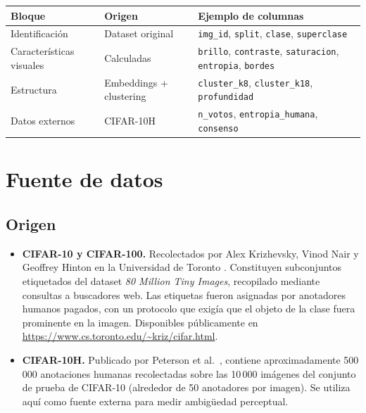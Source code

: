 \documentclass[11pt,a4paper]{article}
\begin{document}
\begin{center}
\small
\begin{tabular}{@{}lll@{}}
\toprule
\textbf{Bloque} & \textbf{Origen} & \textbf{Ejemplo de columnas} \\
\midrule
Identificación & Dataset original & \texttt{img\_id}, \texttt{split}, \texttt{clase}, \texttt{superclase} \\
Características visuales & Calculadas & \texttt{brillo}, \texttt{contraste}, \texttt{saturacion}, \texttt{entropia}, \texttt{bordes} \\
Estructura & Embeddings + clustering & \texttt{cluster\_k8}, \texttt{cluster\_k18}, \texttt{profundidad} \\
Datos externos & CIFAR-10H & \texttt{n\_votos}, \texttt{entropia\_humana}, \texttt{consenso} \\
\bottomrule
\end{tabular}
\end{center}

\section{Fuente de datos}

\subsection{Origen}

\begin{itemize}[leftmargin=*]
  \item \textbf{CIFAR-10 y CIFAR-100.} Recolectados por Alex Krizhevsky, Vinod
  Nair y Geoffrey Hinton en la Universidad de Toronto \cite{krizhevsky2009}.
  Constituyen subconjuntos etiquetados del dataset \emph{80 Million Tiny Images},
  recopilado mediante consultas a buscadores web. Las etiquetas fueron asignadas
  por anotadores humanos pagados, con un protocolo que exigía que el objeto de la
  clase fuera prominente en la imagen. Disponibles públicamente en
  \url{https://www.cs.toronto.edu/~kriz/cifar.html}.
  \item \textbf{CIFAR-10H.} Publicado por Peterson et al.\ \cite{peterson2019},
  contiene aproximadamente 500\,000 anotaciones humanas recolectadas sobre las
  10\,000 imágenes del conjunto de prueba de CIFAR-10 (alrededor de 50 anotadores
  por imagen). Se utiliza aquí como fuente externa para medir ambigüedad
  perceptual.
\end{itemize}
\end{document}
